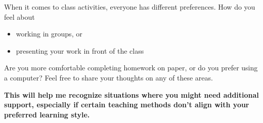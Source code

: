 \documentclass{ximera}
\author{Bart Snapp}
\begin{document}
\begin{question}

    When it comes to class activities, everyone has different preferences. How
    do you feel about
    \begin{itemize}
        \item working in groups, or
        \item presenting your work in front of the class
    \end{itemize}
    Are you more comfortable completing homework on paper, or do you prefer
    using a computer? Feel free to share your thoughts on
    any of these areas.
    
    
    \textbf{This will help me recognize situations where you might
    need additional support, especially if certain teaching methods don’t align
    with your preferred learning style.}


    \begin{freeResponse}
    \end{freeResponse}
\end{question}
\end{document}
